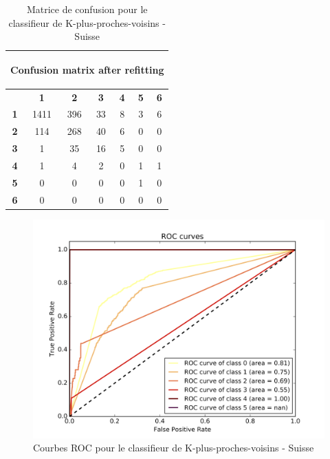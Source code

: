 \documentclass{book}
\begin{document}
\begin{table}[H]
  \begin{center}
  \begin{adjustbox}{max width=\textwidth}
  \begin{tabular}{|c|c|c|c|c|c|c|}
    \hline
    \multicolumn{7}{|c|}{{ \begin{bf}Confusion matrix after refitting\end{bf}}} \\
    \hline
     & \textbf{1} & \textbf{2} & \textbf{3} & \textbf{4} & \textbf{5} & \textbf{6}\\
    \hline
    \textbf{1} & 1411 & 396 & 33 & 8 & 3 & 6\\
    \hline
    \textbf{2} & 114 & 268 & 40 & 6 & 0 & 0\\
    \hline
    \textbf{3} & 1 & 35 & 16 & 5 & 0 & 0\\
    \hline
    \textbf{4} & 1 & 4 & 2 & 0 & 1 & 1\\
    \hline
    \textbf{5} & 0 & 0 & 0 & 0 & 1 & 0\\
    \hline
    \textbf{6} & 0 & 0 & 0 & 0 & 0 & 0\\
    \hline
  \end{tabular}
  \end{adjustbox}
  \end{center}
  \caption{Matrice de confusion pour le classifieur de K-plus-proches-voisins - Suisse}
  \label{knn_cm_suisse}
\end{table}

\begin{figure}[H]
 \begin{center}
\includegraphics[scale=0.4]{../../data/Suisse/test/Nearest_Neighboors_Classification/Nearest_Neighboors_Classification_roc.png}
 \end{center}
 \caption{Courbes ROC pour le classifieur de K-plus-proches-voisins - Suisse}
 \label{knn_roc_suisse}
\end{figure}
\end{document}
